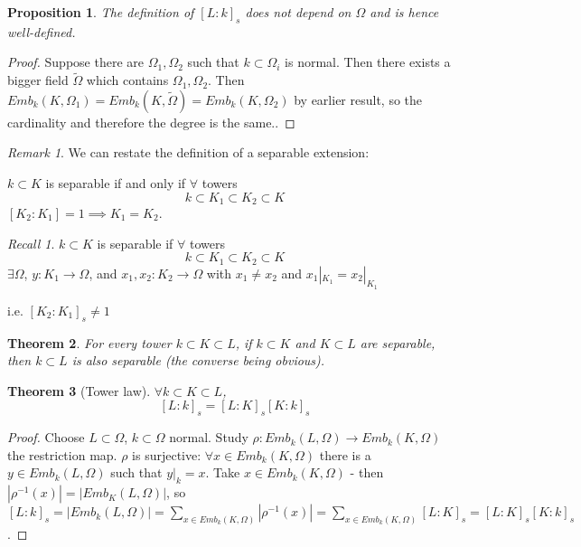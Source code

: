 \documentclass{article}
\theoremstyle{definition}
\theoremstyle{plain}%
\newtheorem{thm}{Theorem}[section]
\newtheorem{prop}[thm]{Proposition}
\theoremstyle{remark}
\newtheorem*{rem}{Remark}
\newtheorem*{rec}{Recall}
\begin{document}
\begin{prop}
    The definition of $[L : k]_s$ does not depend on $\Omega$ and is hence well-defined.
\end{prop}

\begin{proof}
    Suppose there are $\Omega_1, \Omega_2$ such that $k \subset \Omega_i$ is normal. Then there exists a bigger field $\tilde{\Omega}$ which contains $\Omega_1, \Omega_2$. Then $Emb_k(K, \Omega_1) = Emb_k(K, \tilde{\Omega}) = Emb_k(K, \Omega_2)$ by earlier result, so the cardinality and therefore the degree is the same..
\end{proof}

\begin{rem}
    We can restate the definition of a separable extension:
    
    $k \subset K$ is separable if and only if $\forall$ towers
    \[k \subset K_1 \subset K_2 \subset K\]
    $[K_2 : K_1] = 1 \implies K_1 = K_2$.
\end{rem}

\begin{rec}
    $k \subset K$ is separable if $\forall$ towers
    \[k \subset K_1 \subset K_2 \subset K\]
    $\exists \Omega$, $y : K_1 \to \Omega$, and $x_1, x_2 : K_2 \to \Omega$ with $x_1 \ne x_2$ and $x_1|_{K_1} = x_2|_{K_1}$
    
    i.e. $[K_2 : K_1]_s \ne 1$
\end{rec}

\begin{thm}
    For every tower $k \subset K \subset L$, if $k \subset K$ and $K \subset L$ are separable, then $k \subset L$ is also separable (the converse being obvious).
\end{thm}

\begin{thm}[Tower law]
    $\forall k \subset K \subset L$,
    \[[L : k]_s = [L : K]_s [K : k]_s\]
\end{thm}

\begin{proof}
    Choose $L \subset \Omega$, $k \subset \Omega$ normal. Study $\rho : Emb_k(L, \Omega) \to Emb_k(K, \Omega)$ the restriction map. $\rho$ is surjective: $\forall x \in Emb_k(K, \Omega)$ there is a $y \in Emb_k(L, \Omega)$ such that $y|_k = x$. Take $x \in Emb_k(K, \Omega)$ - then $|\rho^{-1}(x)| = |Emb_K(L, \Omega)|$, so $[L : k]_s = |Emb_k(L, \Omega)| = \sum_{x \in Emb_k(K, \Omega)} |\rho^{-1}(x)| = \sum_{x \in Emb_k(K, \Omega)}[L : K]_s = [L : K]_s [K : k]_s$.
\end{proof}
\end{document}
